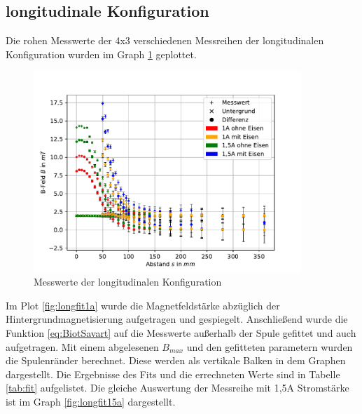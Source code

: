 \documentclass[11pt, a4paper]{article}
\begin{document}
    \subsection{longitudinale Konfiguration}
    Die rohen Messwerte der 4x3 verschiedenen Messreihen der longitudinalen Konfiguration wurden im Graph \ref{fig:longmess} geplottet.
    \begin{figure}[h]
        \centering
        \includegraphics[width=0.9\textwidth]{raw1.pdf}
        \caption{Messwerte der longitudinalen Konfiguration}
        \label{fig:longmess}
    \end{figure}

    Im Plot \ref{fig:longfit1a} wurde die Magnetfeldstärke abzüglich der Hintergrundmagnetisierung aufgetragen und gespiegelt. Anschließend wurde die Funktion \ref{eq:BiotSavart} auf die Messwerte außerhalb der Spule gefittet und auch aufgetragen. Mit einem abgelesenen $B_{max}$ und den gefitteten parametern wurden die Spulenränder berechnet. Diese werden als vertikale Balken in dem Graphen dargestellt. Die Ergebnisse des Fits und die errechneten Werte sind in Tabelle \ref{tab:fit} aufgelistet. Die gleiche Auswertung der Messreihe mit 1,5A Stromstärke ist im Graph \ref{fig:longfit15a} dargestellt.
    
\end{document}

